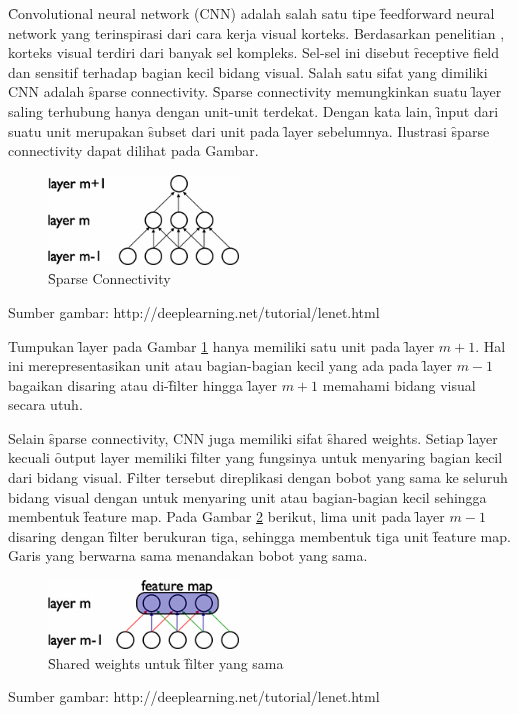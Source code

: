 \f{Convolutional neural network} (CNN) adalah salah satu tipe \f{feedforward neural network} yang terinspirasi dari cara kerja visual korteks. Berdasarkan penelitian , korteks visual terdiri dari banyak sel kompleks. Sel-sel ini disebut \f{receptive field} dan sensitif terhadap bagian kecil bidang visual. Salah satu sifat yang dimiliki CNN adalah \f{sparse connectivity}. \f{Sparse connectivity} memungkinkan suatu \f{layer} saling terhubung hanya dengan unit-unit terdekat. Dengan kata lain, \f{input} dari suatu unit merupakan \f{subset} dari unit pada \f{layer} sebelumnya. Ilustrasi \f{sparse connectivity} dapat dilihat pada Gambar.

\begin{figure}
	\centering
	\includegraphics[width=0.45\textwidth,height=0.2\textwidth]
	{pics/sparse.png}
	\caption{\f{Sparse Connectivity}}
	\label{fig:sparse}
\end{figure}
\vspace{-1.2cm}
\begin{center}
	{\small Sumber gambar: http://deeplearning.net/tutorial/lenet.html}
\end{center}

Tumpukan \f{layer} pada Gambar \ref{fig:sparse} hanya memiliki satu unit pada \f{layer} $m + 1$. Hal ini merepresentasikan unit atau bagian-bagian kecil yang ada pada \f{layer} $m - 1$ bagaikan disaring atau di-\f{filter} hingga \f{layer} $m + 1$ memahami bidang visual secara utuh. 

Selain \f{sparse connectivity}, CNN juga memiliki sifat \f{shared weights}. Setiap \f{layer} kecuali \f{output layer} memiliki \f{filter} yang fungsinya untuk menyaring bagian kecil dari bidang visual. \f{Filter} tersebut direplikasi dengan bobot yang sama ke seluruh bidang visual dengan untuk menyaring unit atau bagian-bagian kecil sehingga membentuk \f{feature map}. Pada Gambar \ref{fig:shared} berikut, lima unit pada \f{layer} $m - 1$ disaring dengan \f{filter} berukuran tiga, sehingga membentuk tiga unit \f{feature map}. Garis yang berwarna sama menandakan bobot yang sama.

\begin{figure}
	\centering
	\includegraphics[width=0.45\textwidth,height=0.15\textwidth]
	{pics/shared.png}
	\caption{\f{Shared weights} untuk \f{filter} yang sama}
	\label{fig:shared}
\end{figure}
\vspace{-1.2cm}
\begin{center}
	{\small Sumber gambar: http://deeplearning.net/tutorial/lenet.html}
\end{center}

